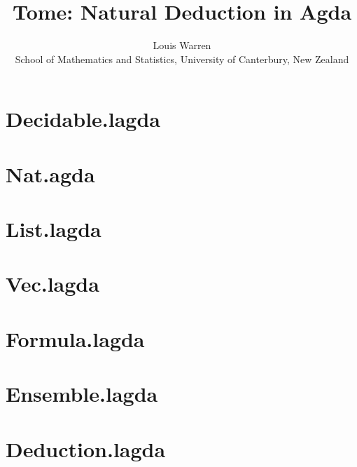 \documentclass{article}
\begin{document}
\title{Tome: Natural Deduction in Agda}
\author{
Louis Warren \\
School of Mathematics and Statistics, University of Canterbury, New Zealand
}
\date{}
\maketitle

\section{Decidable.lagda}


\section{Nat.agda}


\section{List.lagda}


\section{Vec.lagda}


\section{Formula.lagda}


\section{Ensemble.lagda}


\section{Deduction.lagda}

\end{document}
